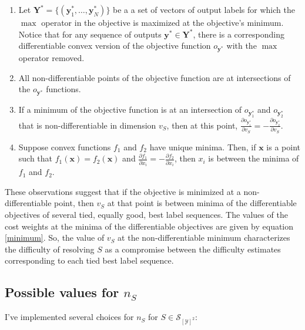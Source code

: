 \documentclass[11pt,letterpaper]{article}
\begin{document}
\begin{enumerate}

\item Let $\mathbf{Y}^*=\{(\mathbf{y}^*_1,\hdots,\mathbf{y}^*_N)\}$ be a 
a set of vectors of output labels for which the $\max$ operator in the objective
is maximized at the objective's minimum.  Notice that for any sequence of outputs
$\mathbf{y}^*\in\mathbf{Y}^*$, there is a corresponding differentiable convex version of the objective function $o_{\mathbf{y}^*}$ with the $\max$ operator removed.  

\item All non-differentiable points of the objective function are at intersections
of the $o_{\mathbf{y}^*}$ functions.

\item If a minimum of the objective function is at an intersection of $o_{\mathbf{y}_1^*}$ and $o_{\mathbf{y}_2^*}$ that is non-differentiable in 
dimension $v_S$, then at this point, $\frac{\partial o_{\mathbf{y}_1^*}}{\partial v_S}=-\frac{\partial o_{\mathbf{y}_2^*}}{\partial v_S}$.

\item Suppose convex functions $f_1$ and $f_2$ have unique minima.  Then, if $\mathbf{x}$ is a point such that $f_1(\mathbf{x})=f_2(\mathbf{x})$ and $\frac{\partial f_1}{\partial x_i}=-\frac{\partial f_2}{\partial x_i}$, then $x_i$
is between the minima of $f_1$ and $f_2$.

\end{enumerate}

These observations suggest that if the objective is minimized at a non-differentiable
point, then $v_S$ at that point is between minima of the differentiable objectives of
several tied, equally good, best label sequences.  The values of the cost weights at
the minima of the differentiable objectives are given by equation \ref{minimum}.  
So, the value of $v_S$ at the non-differentiable minimum characterizes the difficulty
of resolving $S$ as a compromise between the difficulty estimates corresponding
to each tied best label sequence.  

\subsection{Possible values for $n_S$}

I've implemented several choices for $n_S$ for $S\in\mathcal{S}_{[\mathcal{Y}]^2}$:
\end{document}
